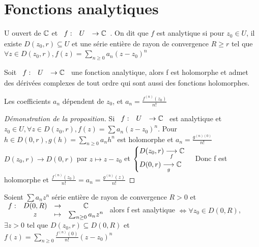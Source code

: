 \documentclass[]{report}
\begin{document}
\section{Fonctions analytiques}

\begin{df}
    U ouvert de $\mathbb{C}$ et $\begin{array}{ccccc} f : & U & \to  \mathbb{C}\end{array}$. On dit que $f$ est analytique si pour $z_0 \in U$, il existe $D(z_0,r)\subseteq U$ et une série entière de rayon de convergence $R\ge r$ tel que $\forall z \in D(z_0,r),f(z)=\sum_{n\ge 0}a_n(z-z_0)^n$
\end{df}

\begin{prop}
    Soit $\begin{array}{ccccc} f : & U & \to  \mathbb{C}\end{array}$ une fonction analytique, alors f est holomorphe et admet des dérivées complexes de tout ordre qui sont aussi des fonctions holomorphes.
\end{prop}

\begin{re}
    Les coefficients $a_n$ dépendent de $z_0$, et $a_n=\frac{f^{(n)}(z_0)}{n!}$
\end{re}

\begin{proof}[Démonstration de la proposition]
    Si $\begin{array}{ccccc} f : & U & \to  \mathbb{C}\end{array}$ est analytique et $z_0\in U,\forall z \in D(z_0,r),f(z)=\sum a_n(z-z_0)^n$. Pour $h\in D(0,r),g(h)=\sum_{n\ge 0}a_nh^n$ est holomorphe et $a_n=\frac{g^{(n)(0)}}{n!}$\\
    $D(z_0,r){\longrightarrow} D(0,r)$ par $z\mapsto z-z_0$ et $\begin{cases}
        D(z_0,r)\underset{f}{\longrightarrow}\mathbb{C}\\
        D(0,r)\underset{g}{\longrightarrow}\mathbb{C}
    \end{cases}$ Donc f est holomorphe et $\frac{f^{(n)}(z_0)}{n!}=a_n=\frac{g^{(n)}(z)}{n!}$
\end{proof}

\begin{prop}
    Soient $\sum a_nz^n$ série entière de rayon de convergence $R>0$ et $\begin{array}{ccccc}
f : & D(0,R) & \to & \mathbb{C} \\
  & z & \mapsto & \sum_{n\ge0}a_nz^n  
\end{array}$ alors f est analytique $\iff \forall z_0 \in D(0,R)$, 
$\exists z>0$ tel que $D(z_0,r) \subseteq D(0,R)$ et \\$f(z)=\sum_{n\ge0}\frac{f^{(n)}(0)}{n!}(z-z_0)^n$
\end{prop}
\end{document}
